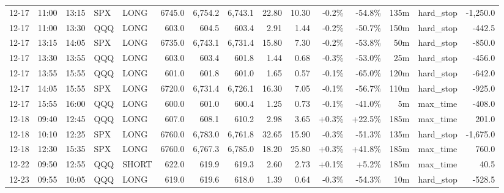 \documentclass[11pt,a4paper,twoside]{article}
\begin{document}
\begin{landscape}
\begin{center}
\begin{longtable}{>{\color{txtmain}}l l l l l r r r r r r r r >{\color{txtmain}}l r}
12-17 & 11:00 & 13:15 & SPX & LONG & 6745.0 & 6,754.2 & 6,743.1 & 22.80 & 10.30 & \textcolor{lossred}{-0.2\%} & \textcolor{lossred}{-54.8\%} & 135m & hard\_stop & \textcolor{lossred}{-1,250.0} \\
12-17 & 11:00 & 13:30 & QQQ & LONG & 603.0 & 604.5 & 603.4 & 2.91 & 1.44 & \textcolor{lossred}{-0.2\%} & \textcolor{lossred}{-50.7\%} & 150m & hard\_stop & \textcolor{lossred}{-442.5} \\
12-17 & 13:15 & 14:05 & SPX & LONG & 6735.0 & 6,743.1 & 6,731.4 & 15.80 & 7.30 & \textcolor{lossred}{-0.2\%} & \textcolor{lossred}{-53.8\%} & 50m & hard\_stop & \textcolor{lossred}{-850.0} \\
12-17 & 13:30 & 13:55 & QQQ & LONG & 603.0 & 603.4 & 601.8 & 1.44 & 0.68 & \textcolor{lossred}{-0.3\%} & \textcolor{lossred}{-53.0\%} & 25m & hard\_stop & \textcolor{lossred}{-456.0} \\
12-17 & 13:55 & 15:55 & QQQ & LONG & 601.0 & 601.8 & 601.0 & 1.65 & 0.57 & \textcolor{lossred}{-0.1\%} & \textcolor{lossred}{-65.0\%} & 120m & hard\_stop & \textcolor{lossred}{-642.0} \\
12-17 & 14:05 & 15:55 & SPX & LONG & 6720.0 & 6,731.4 & 6,726.1 & 16.30 & 7.05 & \textcolor{lossred}{-0.1\%} & \textcolor{lossred}{-56.7\%} & 110m & hard\_stop & \textcolor{lossred}{-925.0} \\
12-17 & 15:55 & 16:00 & QQQ & LONG & 600.0 & 601.0 & 600.4 & 1.25 & 0.73 & \textcolor{lossred}{-0.1\%} & \textcolor{lossred}{-41.0\%} & 5m & max\_time & \textcolor{lossred}{-408.0} \\
12-18 & 09:40 & 12:45 & QQQ & LONG & 607.0 & 608.1 & 610.2 & 2.98 & 3.65 & \textcolor{wingreen}{+0.3\%} & \textcolor{wingreen}{+22.5\%} & 185m & max\_time & \textcolor{wingreen}{201.0} \\
12-18 & 10:10 & 12:25 & SPX & LONG & 6760.0 & 6,783.0 & 6,761.8 & 32.65 & 15.90 & \textcolor{lossred}{-0.3\%} & \textcolor{lossred}{-51.3\%} & 135m & hard\_stop & \textcolor{lossred}{-1,675.0} \\
12-18 & 12:30 & 15:35 & SPX & LONG & 6760.0 & 6,767.3 & 6,785.0 & 18.20 & 25.80 & \textcolor{wingreen}{+0.3\%} & \textcolor{wingreen}{+41.8\%} & 185m & max\_time & \textcolor{wingreen}{760.0} \\
12-22 & 09:50 & 12:55 & QQQ & SHORT & 622.0 & 619.9 & 619.3 & 2.60 & 2.73 & \textcolor{wingreen}{+0.1\%} & \textcolor{wingreen}{+5.2\%} & 185m & max\_time & \textcolor{wingreen}{40.5} \\
12-23 & 09:55 & 10:05 & QQQ & LONG & 619.0 & 619.6 & 618.0 & 1.39 & 0.64 & \textcolor{lossred}{-0.3\%} & \textcolor{lossred}{-54.3\%} & 10m & hard\_stop & \textcolor{lossred}{-528.5} \\

\end{longtable}
\end{center}
\end{landscape}
\end{document}
